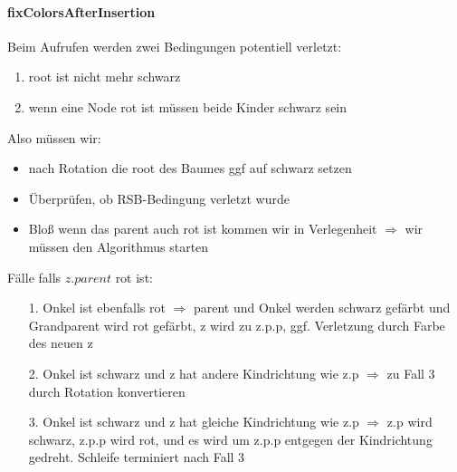 \documentclass[
    ngerman,
    color=3b,
    dark_mode,
    load_common, %
    summary,
    boxarc,
]{rubos-tuda-template}
\begin{document}
\paragraph{fixColorsAfterInsertion}
Beim Aufrufen werden zwei Bedingungen potentiell verletzt:
\begin{enumerate}
    \item root ist nicht mehr schwarz
    \item wenn eine Node rot ist müssen beide Kinder schwarz sein
\end{enumerate}
Also müssen wir:
\begin{itemize}
    \item nach Rotation die root des Baumes ggf auf schwarz setzen
    \item Überprüfen, ob RSB-Bedingung verletzt wurde
    \item Blo\ss{} wenn das parent auch rot ist kommen wir in Verlegenheit $\Longrightarrow$ wir müssen den Algorithmus starten
\end{itemize}

Fälle falls $z.parent$ rot ist:\\
\begin{minipage}{.5\textwidth-1pt}
    \begin{itemize}
        \item[1.] Onkel ist ebenfalls rot $\Rightarrow$ parent und Onkel werden schwarz gefärbt und Grandparent wird rot gefärbt, z wird zu z.p.p, ggf. Verletzung durch Farbe des neuen z
        \item[2.] Onkel ist schwarz und z hat andere Kindrichtung wie z.p $\Rightarrow$ zu Fall 3 durch Rotation konvertieren
        \item[3.] Onkel ist schwarz und z hat gleiche Kindrichtung wie z.p $\Rightarrow$ z.p wird schwarz, z.p.p wird rot, und es wird um z.p.p entgegen der Kindrichtung gedreht. Schleife terminiert nach Fall 3
    \end{itemize}
\end{minipage}\hspace{2pt}%
\begin{minipage}{.5\textwidth-1pt}
    \begin{tcolorbox}[
            colback=yellow!20,
            colframe=black!70,
            enhanced,
            title={Fall 1},
            fonttitle=\sffamily\bfseries,
            center title,
            every float=\centering
        ]
        \centering
        
    \end{tcolorbox}
\end{minipage}
\end{document}

